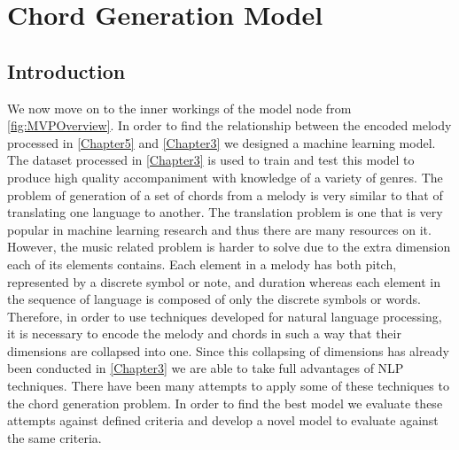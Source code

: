 
\chapter{Chord Generation Model} %
\label{Chapter4} %


\newcommand{\keyword}[1]{\textbf{#1}}
\newcommand{\tabhead}[1]{\textbf{#1}}
\newcommand{\code}[1]{\texttt{#1}}
\newcommand{\file}[1]{\texttt{\bfseries#1}}
\newcommand{\option}[1]{\texttt{\itshape#1}}



\section{Introduction}

We now move on to the inner workings of the model node from \cref{fig:MVPOverview}.
In order to find the relationship between the encoded melody processed in \cref{Chapter5} and \cref{Chapter3} we designed a machine learning model.
The dataset processed in \cref{Chapter3} is used to train and test this model to produce high quality accompaniment with knowledge of a variety of genres.
The problem of generation of a set of chords from a melody is very similar to that of translating one language to another. 
The translation problem is one that is very popular in machine learning research and thus there are many resources on it.  
However, the music related problem is harder to solve due to the extra dimension each of its elements contains. 
Each element in a melody has both pitch, represented by a discrete symbol or note, and duration whereas each element in the sequence of language is composed of only the discrete symbols or words.  
Therefore, in order to use techniques developed for natural language processing, it is necessary to encode the melody and chords in such a way that their dimensions are collapsed into one. 
Since this collapsing of dimensions has already been conducted in \cref{Chapter3} we are able to take full advantages of NLP techniques.
There have been many attempts to apply some of these techniques to the chord generation problem. 
In order to find the best model we evaluate these attempts against defined criteria and develop a novel model to evaluate against the same criteria.


